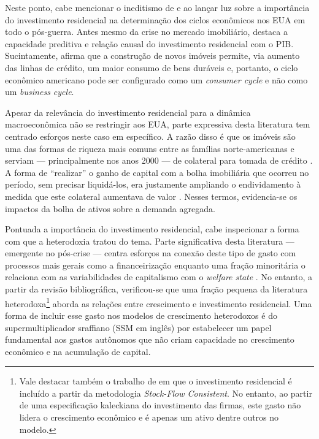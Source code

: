 Neste ponto, cabe mencionar o ineditismo de \textcite{green_follow_1997} e \textcite{leamer_housing_2007} ao lançar luz sobre a importância do investimento residencial na determinação dos ciclos econômicos nos EUA em todo o pós-guerra.
Antes mesmo da crise no mercado imobiliário,
\textcite{leamer_housing_2007} destaca a capacidade preditiva e relação causal  do investimento residencial com o PIB. Sucintamente, afirma que a construção de novos imóveis permite, via aumento das linhas de crédito, um maior consumo de bens duráveis e, portanto, o ciclo econômico americano pode ser configurado como um \textit{consumer cycle} e não como um \textit{business cycle}.

Apesar da relevância do investimento residencial para a dinâmica macroeconômica não se restringir aos EUA, parte expressiva desta literatura tem centrado esforços neste caso em específico. A razão disso é que os imóveis são  uma das formas de riqueza mais comuns entre as famílias norte-americanas e serviam --- principalmente nos anos 2000 --- de colateral para tomada de crédito \cite{teixeira_uma_2011}. A forma de ``realizar'' o ganho de capital com a bolha imobiliária que ocorreu no período, sem precisar liquidá-los, era justamente ampliando o endividamento à medida que este colateral aumentava de valor \cite{teixeira_crescimento_2015}. Nesses termos, evidencia-se os impactos da bolha de ativos sobre a demanda agregada. 

Pontuada a importância do investimento residencial, cabe inspecionar a forma com que a heterodoxia tratou do tema. Parte significativa desta literatura  --- emergente no pós-crise --- centra esforços na conexão deste tipo de gasto com processos mais gerais como a financeirização \cites{aalbers_financialization_2008}{bibow_financialization_2010} enquanto uma fração minoritária o relaciona com as variabilidades de capitalismo com o \textit{welfare state} \cite{schwartz_politics_2009}. 
No entanto, a partir da revisão bibliográfica, verificou-se que uma fração pequena da literatura heterodoxa\footnote{
	Vale destacar também o trabalho de \textcite{zezza_u.s._2008} em que o investimento residencial é incluído a partir da metodologia \textit{Stock-Flow Consistent}. No entanto, ao partir de uma especificação kaleckiana do investimento das firmas, este gasto não lidera o crescimento econômico e é apenas um ativo dentre outros no modelo.}
aborda as relações entre crescimento e investimento residencial. 
Uma forma de incluir esse gasto nos modelos de crescimento heterodoxos é do supermultiplicador sraffiano (SSM em inglês) por estabelecer um papel fundamental aos gastos autônomos que não criam capacidade no crescimento econômico e na acumulação de capital.

